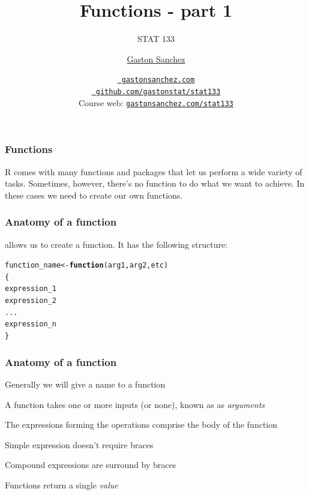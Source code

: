\documentclass[12pt]{beamer}\usepackage[]{graphicx}\usepackage[]{color}
\title{Functions - part 1}
\subtitle{STAT 133}
\author{\href{http://www.gastonsanchez.com}{Gaston Sanchez}}
\institute{Department of Statistics, UC{\textendash}Berkeley}
\date{\href{http://www.gastonsanchez.com}{\tt \scriptsize \color{foreground} gastonsanchez.com}
\\[-4pt]
\href{http://github.com/gastonstat/stat133}{\tt \scriptsize \color{foreground} github.com/gastonstat/stat133}
\\[-4pt]
{\scriptsize Course web: \href{http://www.gastonsanchez.com/stat133}{\tt gastonsanchez.com/stat133}}
}
\makeatletter
\newcommand{\hlstd}[1]{\textcolor[rgb]{0.345,0.345,0.345}{#1}}%
\newcommand{\hlkwa}[1]{\textcolor[rgb]{0.161,0.373,0.58}{\textbf{#1}}}%
\newcommand{\hlkwb}[1]{\textcolor[rgb]{0.69,0.353,0.396}{#1}}%
\newcommand{\hlkwc}[1]{\textcolor[rgb]{0.333,0.667,0.333}{#1}}%
\newenvironment{kframe}{%
 \def\at@end@of@kframe{}%
 \ifinner\ifhmode%
  \def\at@end@of@kframe{\end{minipage}}%
  \begin{minipage}{\columnwidth}%
 \fi\fi%
 \def\FrameCommand##1{\hskip\@totalleftmargin \hskip-\fboxsep
 \colorbox{shadecolor}{##1}\hskip-\fboxsep
     \hskip-\linewidth \hskip-\@totalleftmargin \hskip\columnwidth}%
 \MakeFramed {\advance\hsize-\width
   \@totalleftmargin\z@ \linewidth\hsize
   \@setminipage}}%
 {\par\unskip\endMakeFramed%
 \at@end@of@kframe}
\newenvironment{knitrout}{}{} %
\makeatother
\begin{document}
{
  \frame{
    \titlepage
  } 
}


\begin{frame}
\frametitle{Functions}

R comes with many functions and packages that let us perform a wide variety of tasks. Sometimes, however, there's no function to do what we want to achieve. In these cases we need to create our own functions.

\end{frame}


\begin{frame}
\begin{center}
\Huge{}
\end{center}
\end{frame}


\begin{frame}[fragile]
\frametitle{Anatomy of a function}

{\hilit {}} allows us to create a function. It has the following structure:

\begin{knitrout}\footnotesize
{}\color{fgcolor}\begin{kframe}
\begin{alltt}
\hlstd{function_name} \hlkwb{<-} \hlkwa{function}\hlstd{(}\hlkwc{arg1}\hlstd{,} \hlkwc{arg2}\hlstd{,} \hlkwc{etc}\hlstd{)}
\hlstd{\{}
  \hlstd{expression_1}
  \hlstd{expression_2}
  \hlstd{...}
  \hlstd{expression_n}
\hlstd{\}}
\end{alltt}
\end{kframe}
\end{knitrout}

\end{frame}


\begin{frame}
\frametitle{Anatomy of a function}

\bi
  \item Generally we will give a name to a function
  \item A function takes one or more inputs (or none), known as as \textit{arguments}
  \item The expressions forming the operations comprise the body of the function
  \item Simple expression doesn't require braces
  \item Compound expressions are surround by braces
  \item Functions return a single \textit{value}
\ei

\end{frame}
\end{document}
